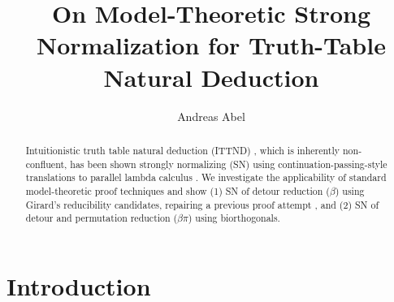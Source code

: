 \documentclass[a4paper,USenglish,cleveref, autoref, thm-restate]{lipics-v2019}
\title{On Model-Theoretic Strong Normalization for Truth-Table Natural Deduction}
\author{Andreas Abel
  }{Department of Computer Science,
    Gothenburg University,
    Sweden
  }{andreas.abel@gu.se
  }{https://orcid.org/0000-0003-0420-4492
  }{}
\begin{document}
\maketitle

\begin{abstract}
  Intuitionistic truth table natural deduction (ITTND)
  \cite{geuversHurkens:icla17,geuversHurkens:types17}, which is
  inherently non-confluent, has been shown strongly normalizing (SN)
  using continuation-passing-style translations to parallel lambda
  calculus \cite{geuversGiessenHurkens:fundinf19}.  We investigate the
  applicability of standard model-theoretic proof techniques and show
  (1) SN of detour reduction ($\beta$) using Girard's reducibility
  candidates, repairing a previous proof attempt
  \cite{geuversHurkens:types17}, and (2) SN of detour and permutation
  reduction ($\beta\pi$) using biorthogonals.
\end{abstract}

\section{Introduction}
\label{sec:intro}

%
%
%
%


%
%
%
%
%
\end{document}
